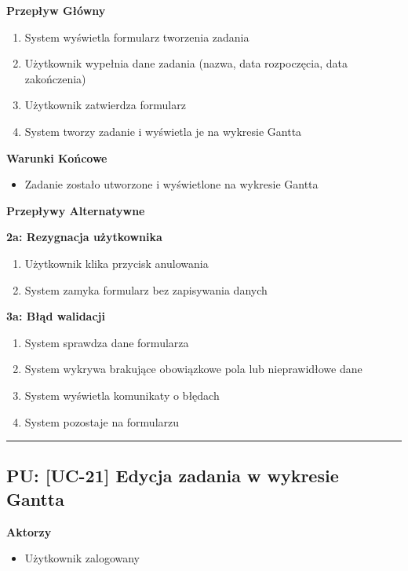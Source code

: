 \vspace{0.2cm}
\noindent\textbf{Przepływ Główny}
\begin{enumerate}
    \item System wyświetla formularz tworzenia zadania
    \item Użytkownik wypełnia dane zadania (nazwa, data rozpoczęcia, data zakończenia)
    \item Użytkownik zatwierdza formularz
    \item System tworzy zadanie i wyświetla je na wykresie Gantta
\end{enumerate}

\vspace{0.2cm}
\noindent\textbf{Warunki Końcowe}
\begin{itemize}
    \item Zadanie zostało utworzone i wyświetlone na wykresie Gantta
\end{itemize}

\vspace{0.2cm}
\noindent\textbf{Przepływy Alternatywne}

\textbf{2a: Rezygnacja użytkownika}
\begin{enumerate}
    \item Użytkownik klika przycisk anulowania
    \item System zamyka formularz bez zapisywania danych
\end{enumerate}

\textbf{3a: Błąd walidacji}
\begin{enumerate}
    \item System sprawdza dane formularza
    \item System wykrywa brakujące obowiązkowe pola lub nieprawidłowe dane
    \item System wyświetla komunikaty o błędach
    \item System pozostaje na formularzu
\end{enumerate}


\hrule
\vspace{1cm}

\subsection*{PU: [UC-21] Edycja zadania w wykresie Gantta}

\noindent\textbf{Aktorzy}
\begin{itemize}
    \item Użytkownik zalogowany
\end{itemize}

